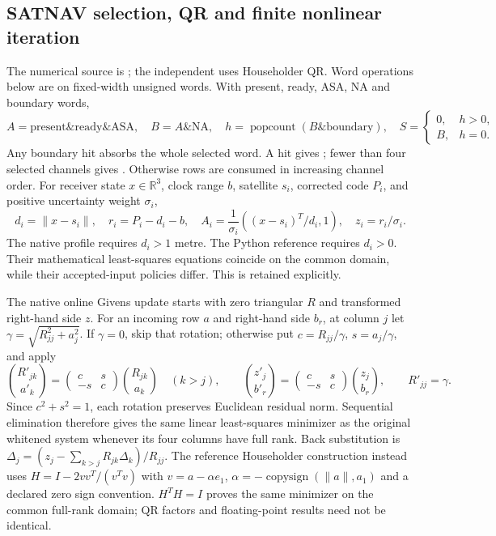 \subsection{SATNAV selection, QR and finite nonlinear iteration}
\label{sec:lift-satnav}
The numerical source is ; the independent
 uses Householder QR. Word operations below are on
fixed-width unsigned words. With present, ready, ASA, NA and boundary words,
\begin{equation}
 A=\text{present}\mathbin{\&}\text{ready}\mathbin{\&}\text{ASA},\quad
 B=A\mathbin{\&}\text{NA},\quad h=\operatorname{popcount}(B\mathbin{\&}\text{boundary}),
 \quad S=\begin{cases}0,&h>0,\\B,&h=0.\end{cases}
\end{equation}
Any boundary hit absorbs the whole selected word. A hit gives
; fewer than four selected channels gives
. Otherwise rows are consumed in increasing channel order.
For receiver state $x\in\mathbb R^3$, clock range $b$, satellite $s_i$,
corrected code $P_i$, and positive uncertainty weight $\sigma_i$,
\begin{equation}
 d_i=\|x-s_i\|,\quad r_i=P_i-d_i-b,\quad
 A_i=\frac1{\sigma_i}\left((x-s_i)^T/d_i,1\right),\quad
 z_i=r_i/\sigma_i .
\end{equation}
The native profile requires $d_i>1$ metre. The Python reference requires
$d_i>0$. Their mathematical least-squares equations coincide on the common
domain, while their accepted-input policies differ. This is retained explicitly.

The native online Givens update starts with zero triangular $R$ and transformed
right-hand side $z$. For an incoming row $a$ and right-hand side $b_r$, at
column $j$ let $\gamma=\sqrt{R_{jj}^2+a_j^2}$. If $\gamma=0$, skip that rotation;
otherwise put $c=R_{jj}/\gamma$, $s=a_j/\gamma$, and apply
\begin{equation}
 \binom{R'_{jk}}{a'_k}=\begin{pmatrix}c&s\\-s&c\end{pmatrix}
 \binom{R_{jk}}{a_k}\quad(k>j),\qquad
 \binom{z'_j}{b'_r}=\begin{pmatrix}c&s\\-s&c\end{pmatrix}
 \binom{z_j}{b_r},\qquad R'_{jj}=\gamma .
\end{equation}
Since $c^2+s^2=1$, each rotation preserves Euclidean residual norm. Sequential
elimination therefore gives the same linear least-squares minimizer as the
original whitened system whenever its four columns have full rank. Back
substitution is $\Delta_j=(z_j-\sum_{k>j}R_{jk}\Delta_k)/R_{jj}$.
The reference Householder construction instead uses
$H=I-2vv^T/(v^Tv)$ with $v=a-\alpha e_1$,
$\alpha=-\operatorname{copysign}(\|a\|,a_1)$ and a declared zero sign convention.
$H^TH=I$ proves the same minimizer on the common full-rank domain; QR factors
and floating-point results need not be identical.

